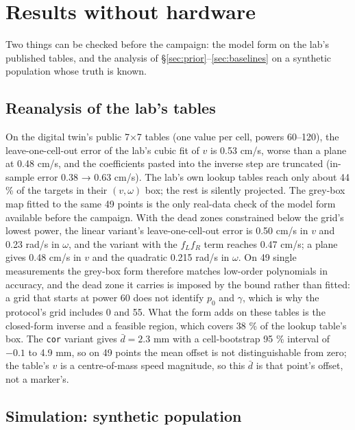 \section{Results without hardware}\label{sec:simulation}

Two things can be checked before the campaign: the model form on the
lab's published tables, and the analysis of
§\ref{sec:prior}--\ref{sec:baselines} on a synthetic population whose
truth is known.

\subsection{Reanalysis of the lab's tables}\label{sec:lab-tables}

On the digital twin's public 7×7 tables (one value per cell, powers
60--120), the leave-one-cell-out error of the lab's cubic fit of \(v\)
is 0.53 cm/s, worse than a plane at 0.48 cm/s, and the coefficients
pasted into the inverse step are truncated (in-sample error 0.38 → 0.63
cm/s). The lab's own lookup tables reach only about 44 \% of the
targets in their \((v,\omega)\) box; the rest is silently projected.
The grey-box map fitted to the same 49 points is the only real-data
check of the model form available before the campaign. With the dead
zones constrained below the grid's lowest power, the linear variant's
leave-one-cell-out error is 0.50 cm/s in \(v\) and 0.23 rad/s in
\(\omega\), and the variant with the \(f_L f_R\) term reaches 0.47
cm/s; a plane gives 0.48 cm/s in \(v\) and the quadratic 0.215 rad/s in
\(\omega\). On 49 single measurements the grey-box form therefore
matches low-order polynomials in accuracy, and the dead zone it carries
is imposed by the bound rather than fitted: a grid that starts at power
60 does not identify \(p_0\) and \(\gamma\), which is why the
protocol's grid includes 0 and 55. What the form adds on these tables is
the closed-form inverse and a feasible region, which covers 38 \% of the
lookup table's box. The \texttt{cor} variant gives \(\bar d = 2.3\) mm
with a cell-bootstrap 95 \% interval of \(-0.1\) to 4.9 mm, so on 49
points the mean offset is not distinguishable from zero; the table's
\(v\) is a centre-of-mass speed magnitude, so this \(\bar d\) is that
point's offset, not a marker's.

\subsection{Simulation: synthetic population}

